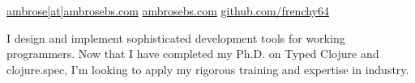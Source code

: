 \documentclass[10pt,a4paper]{article}
\begin{document}
\sloppy  %



\nobreakvspace{0.3em}  %

\noindent\href{mailto:ambrose.at.ambrosebs.dot.com}{ambrose\mbox{}[at]\mbox{}ambrosebs.com}\sbull
\href{https://ambrosebs.com/}{ambrosebs.com}\sbull
\href{https://github.com/frenchy64}{github.com/frenchy64}




I design and implement sophisticated development tools for working programmers.
%
%
Now that I have completed my Ph.D. on Typed Clojure and clojure.spec,
I'm looking to apply my rigorous training and expertise
in industry.

\end{document}
